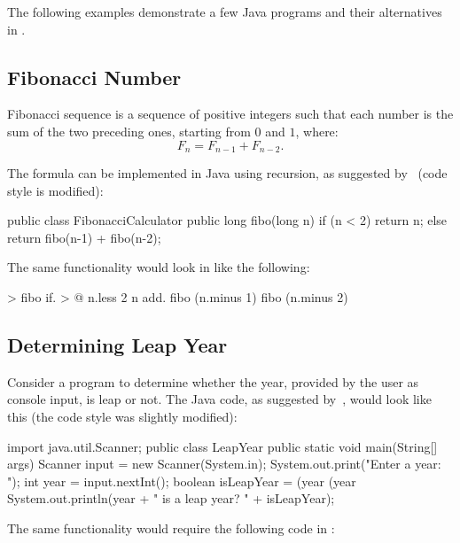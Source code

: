 The following examples demonstrate a few Java programs and their alternatives
in \eo{}.

\subsection{Fibonacci Number}

Fibonacci sequence is a sequence of positive integers such that
each number is the sum of the two preceding ones, starting from $0$ and $1$, where:
\begin{equation*}
F_n = F_{n-1} + F_{n-2}.
\end{equation*}

The formula can be implemented in Java using recursion, as suggested
by~\citet[p.743]{deitel2007java} (code style is modified):

\begin{ffcode}
public class FibonacciCalculator {
  public long fibo(long n) {
    if (n < 2) {
      return n;
    } else {
      return fibo(n-1) + fibo(n-2);
    }
  }
}
\end{ffcode}

The same functionality would look in \eo{} like the following:

\begin{ffcode}
[n] > fibo
  if. > @
    n.less 2
    n
    add.
      fibo (n.minus 1)
      fibo (n.minus 2)
\end{ffcode}

\subsection{Determining Leap Year}

Consider a program to determine whether the year, provided
by the user as console input, is leap or not. The Java code,
as suggested by~\citet[pp.105--106]{liang2012}, would look like this
(the code style was slightly modified):

\begin{ffcode}
import java.util.Scanner;
public class LeapYear {
  public static void main(String[] args) {
    Scanner input = new Scanner(System.in);
    System.out.print("Enter a year: ");
    int year = input.nextInt();
    boolean isLeapYear =
      (year %
      (year %
    System.out.println(year +
      " is a leap year? " + isLeapYear);
  }
}
\end{ffcode}

The same functionality would require the following code in \eo{}:

